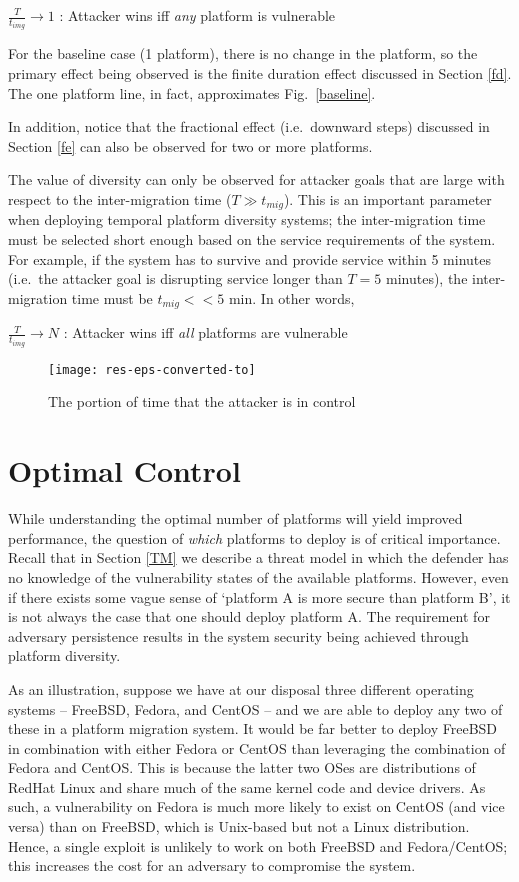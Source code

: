 \documentclass{acm_proc_article-sp}
\begin{document}
$\frac{T}{t_{img}}\rightarrow 1$ : Attacker wins iff \textit{any} platform is vulnerable

For the baseline case (1 platform), there is no change in the platform, so the primary effect being observed is the finite duration effect discussed in Section \ref{fd}. The one platform line, in fact, approximates Fig.~\ref{baseline}. 

In addition, notice that the fractional effect (i.e.~downward steps) discussed in Section \ref{fe} can also be observed for two or more platforms.

The value of diversity can only be observed for attacker goals that are large with respect to the inter-migration time ($T\gg t_{mig}$). This is an important parameter when deploying temporal platform diversity systems; the inter-migration time must be selected short enough based on the service requirements of the system. For example, if the system has to survive and provide service within 5 minutes (i.e.~the attacker goal is disrupting service longer than $T = 5$ minutes), the inter-migration time must be $t_{mig}<<5$ min. In other words,

$\frac{T}{t_{img}}\rightarrow N$ : Attacker wins iff \textit{all} platforms are vulnerable

\begin{figure}
\begin{centering}
\texttt{[image: res-eps-converted-to]}
\end{centering}
\caption{The portion of time that the attacker is in control }
\label{FigureResults1}
\end{figure}

\section{Optimal Control}
\label{GTOC}

While understanding the optimal number of platforms will yield improved performance, the question of \emph{which} platforms to deploy is of critical importance. Recall that in Section \ref{TM} we describe a threat model in which the defender has no knowledge of the vulnerability states of the available platforms. However, even if there exists some vague sense of `platform A is more secure than platform B', it is not always the case that one should deploy platform A. The requirement for adversary persistence results in the system security being achieved through platform diversity.

As an illustration, suppose we have at our disposal three different operating systems -- FreeBSD, Fedora, and CentOS -- and we are able to deploy any two of these in a platform migration system. It would be far better to deploy FreeBSD in combination with either Fedora or CentOS than leveraging the combination of Fedora and CentOS. This is because the latter two OSes are distributions of RedHat Linux and share much of the same kernel code and device drivers. As such, a vulnerability on Fedora is much more likely to exist on CentOS (and vice versa) than on FreeBSD, which is Unix-based but not a Linux distribution. Hence, a single exploit is unlikely to work on both FreeBSD and Fedora/CentOS; this increases the cost for an adversary to compromise the system.
\end{document}

